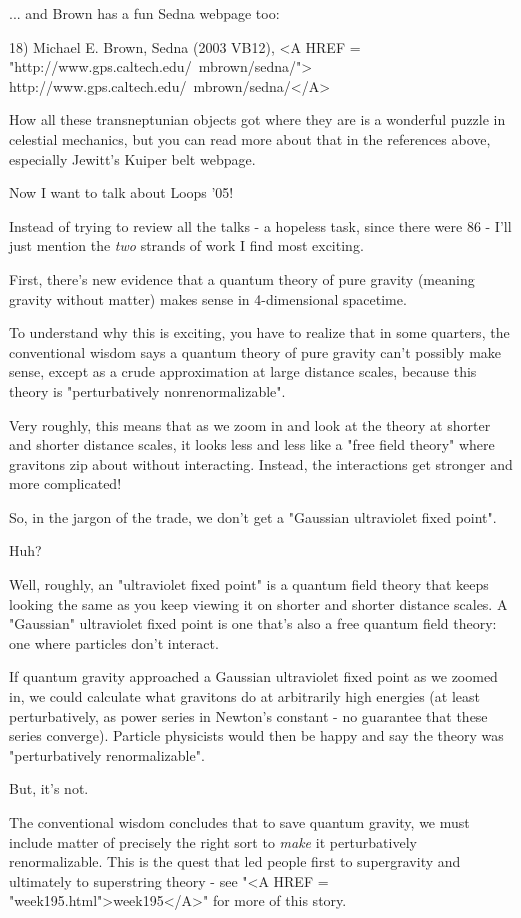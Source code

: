 ... and Brown has a fun Sedna webpage too:

18) Michael E. Brown, Sedna (2003 VB12), 
<A HREF = "http://www.gps.caltech.edu/~mbrown/sedna/">
http://www.gps.caltech.edu/~mbrown/sedna/</A>

How all these transneptunian objects got where they are is a wonderful
puzzle in celestial mechanics, but you can read more about that in
the references above, especially Jewitt's Kuiper belt webpage.

Now I want to talk about Loops '05!

Instead of trying to review all the talks - a hopeless task, since
there were 86 - I'll just mention
the \emph{two} strands of work I find most exciting.

First, there's new evidence that a quantum theory of pure gravity
(meaning gravity without matter) makes sense in 4-dimensional spacetime.  

To understand why this is exciting, you have to realize that in some 
quarters, the conventional wisdom says a quantum theory of pure gravity
can't possibly make sense, except as a crude approximation at large
distance scales, because this theory is "perturbatively 
nonrenormalizable".

Very roughly, this means that as we zoom in and look at the theory at
shorter and shorter distance scales, it looks less and less like a 
"free field theory" where gravitons zip about without interacting.   
Instead, the interactions get stronger and more complicated!  

So, in the jargon of the trade, we don't get a "Gaussian ultraviolet 
fixed point".   

Huh?

Well, roughly, an "ultraviolet fixed point" is a quantum field theory
that keeps looking the same as you keep viewing it on shorter and
shorter distance scales.  A "Gaussian" ultraviolet fixed point is one
that's also a free quantum field theory: one where particles don't 
interact.  

If quantum gravity approached a Gaussian ultraviolet fixed point as 
we zoomed in, we could calculate what gravitons do at arbitrarily 
high energies (at least perturbatively, as power series in Newton's 
constant - no guarantee that these series converge).  Particle 
physicists would then be happy and say the theory was "perturbatively 
renormalizable".  

But, it's not.

The conventional wisdom concludes that to save quantum gravity, we 
must include matter of precisely the right sort to \emph{make} it 
perturbatively renormalizable.  This is the quest that led people 
first to supergravity and ultimately to superstring theory - see
"<A HREF = "week195.html">week195</A>" for more of this story.

